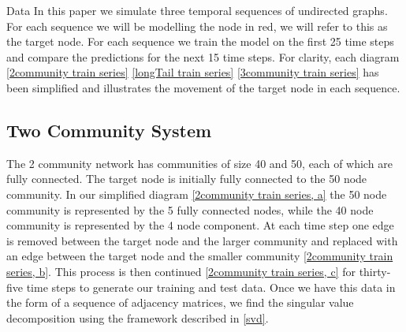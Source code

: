 \documentclass[12pt]{amsart}
\begin{document}
\begin{section}{Data}
    In this paper we simulate three temporal sequences of undirected graphs. For each sequence we will be modelling the node in red, we will refer to this as the target node. For each sequence we train the model on the first 25 time steps and compare the predictions for the next 15 time steps. For clarity, each diagram \autoref{2community train series} \autoref{longTail train series} \autoref{3community train series} has been simplified and illustrates the movement of the target node in each sequence.

    \subsection{Two Community System}
        The 2 community network has communities of size 40 and 50, each of which are fully connected. The target node is initially fully connected to the 50 node community. In our simplified diagram \autoref{2community train series, a} the 50 node community is represented by the 5 fully connected nodes, while the 40 node community is represented by the 4 node component. At each time step one edge is removed between the target node and the larger community and replaced with an edge between the target node and the smaller community \autoref{2community train series, b}. This process is then continued \autoref{2community train series, c} for thirty-five time steps to generate our training and test data. Once we have this data in the form of a sequence of adjacency matrices, we find the singular value decomposition using the framework described in \autoref{svd}.


\end{section}
\end{document}
